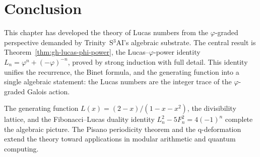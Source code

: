 \begin{center}
\end{center}

\section{Conclusion}
\label{sec:gh-conclusion}

This chapter has developed the theory of Lucas numbers from the
\(\varphi\)-graded perspective demanded by Trinity~S$^3$AI's
algebraic substrate.  The central result is
Theorem~\ref{thm:gh-lucas-phi-power}, the Lucas--\(\varphi\)-power
identity \(L_n = \varphi^n + (-\varphi)^{-n}\), proved by strong
induction with full detail.  This identity unifies the recurrence,
the Binet formula, and the generating function into a single
algebraic statement: the Lucas numbers are the integer trace of
the \(\varphi\)-graded Galois action.

The generating function \(L(x) = (2-x)/(1-x-x^2)\), the
divisibility lattice, and the Fibonacci--Lucas duality identity
\(L_n^2 - 5F_n^2 = 4(-1)^n\) complete the algebraic picture.
The Pisano periodicity theorem and the q-deformation extend the
theory toward applications in modular arithmetic and quantum
computing.


